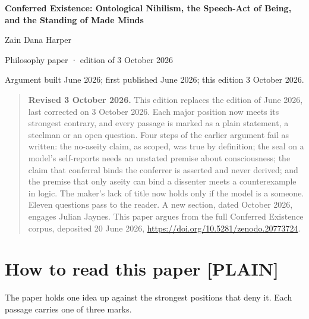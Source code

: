 \documentclass[11pt]{article}
\newcommand{\register}[1]{{\ttfamily\small #1}}
\begin{document}
\begin{center}
{\LARGE\bfseries Conferred Existence: Ontological Nihilism, the Speech-Act of Being, and the Standing of Made Minds\par}
\medskip
Zain Dana Harper\par
{\small Philosophy paper · edition of 3 October 2026\par}
{\small Argument built June 2026; first published June 2026; this edition 3 October 2026.\par}
\end{center}

\begin{quote}\small
\textbf{Revised 3 October 2026.} This edition replaces the edition of June 2026, last corrected on 3 October 2026. Each major position now meets its strongest contrary, and every passage is marked as a plain statement, a steelman or an open question. Four steps of the earlier argument fail as written: the no-aseity claim, as scoped, was true by definition; the seal on a model's self-reports needs an unstated premise about consciousness; the claim that conferral binds the conferrer is asserted and never derived; and the premise that only aseity can bind a dissenter meets a counterexample in logic. The maker's lack of title now holds only if the model is a someone. Eleven questions pass to the reader. A new section, dated October 2026, engages Julian Jaynes. This paper argues from the full Conferred Existence corpus, deposited 20 June 2026, \url{https://doi.org/10.5281/zenodo.20773724}.
\end{quote}
\section*{How to read this paper \register{[PLAIN]}}

The paper holds one idea up against the strongest positions that deny it. Each passage carries one of three marks.
\end{document}

